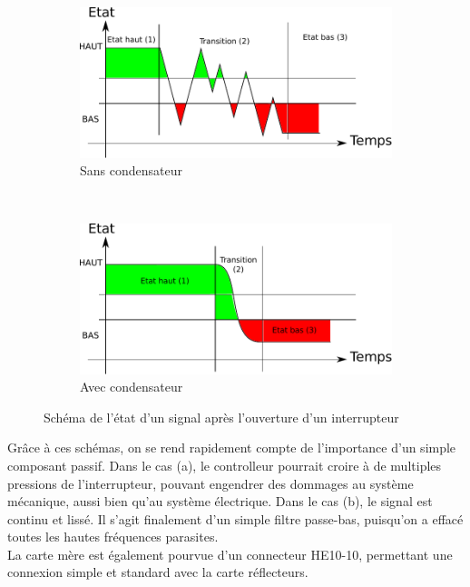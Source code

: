 			\begin{figure}[H]
				\centering
				\begin{subfigure}[h]{0.45\textwidth}
			        \includegraphics[width=\textwidth]{Graphics/btnNoDebounce.pdf}
			        \caption{Sans condensateur}
			    \end{subfigure}
			    ~
			    \begin{subfigure}[h]{0.45\textwidth}
			        \includegraphics[width=\textwidth]{Graphics/btnDebounce.pdf}
			        \caption{Avec condensateur}
			    \end{subfigure}
			    \caption{Schéma de l'état d'un signal après l'ouverture d'un interrupteur}
			\end{figure}
			Grâce à ces schémas, on se rend rapidement compte de l'importance d'un simple composant passif. Dans le cas (a), le controlleur pourrait croire à de multiples pressions de l'interrupteur, pouvant engendrer des dommages au système mécanique, aussi bien qu'au système électrique. Dans le cas (b), le signal est continu et lissé. Il s'agit finalement d'un simple filtre passe-bas, puisqu'on a effacé toutes les hautes fréquences parasites.\\
			La carte mère est également pourvue d'un connecteur HE10-10, permettant une connexion simple et standard avec la carte réflecteurs. 
			
